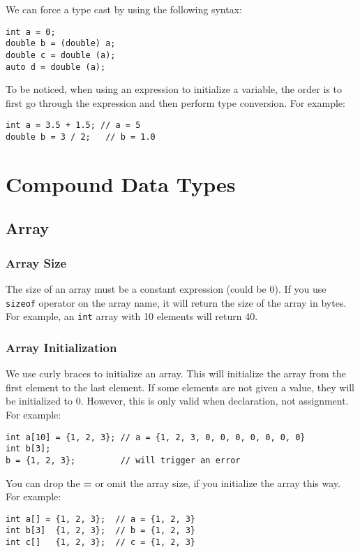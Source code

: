 \documentclass[a4paper,12pt]{article}
\begin{document}
We can force a type cast by using the following syntax:
\begin{verbatim}
int a = 0;
double b = (double) a;
double c = double (a);
auto d = double (a);
\end{verbatim}

To be noticed, when using an expression to initialize a variable, the order is to first go through the expression and then perform type conversion.
For example:
\begin{verbatim}
int a = 3.5 + 1.5; // a = 5
double b = 3 / 2;   // b = 1.0
\end{verbatim}

\section{Compound Data Types}

\subsection{Array}

\subsubsection{Array Size}

The size of an array must be a constant expression (could be 0).
If you use \texttt{sizeof} operator on the array name, it will return the size of the array in bytes.
For example, an \texttt{int} array with 10 elements will return 40.

\subsubsection{Array Initialization}

We use curly braces to initialize an array.
This will initialize the array from the first element to the last element.
If some elements are not given a value, they will be initialized to 0.
However, this is only valid when declaration, not assignment.
For example:
\begin{verbatim}
int a[10] = {1, 2, 3}; // a = {1, 2, 3, 0, 0, 0, 0, 0, 0, 0}
int b[3];
b = {1, 2, 3};         // will trigger an error
\end{verbatim}

You can drop the \textbf{=} or omit the array size, if you initialize the array this way.
For example:
\begin{verbatim}
int a[] = {1, 2, 3};  // a = {1, 2, 3}
int b[3]  {1, 2, 3};  // b = {1, 2, 3}
int c[]   {1, 2, 3};  // c = {1, 2, 3}
\end{verbatim}
\end{document}
